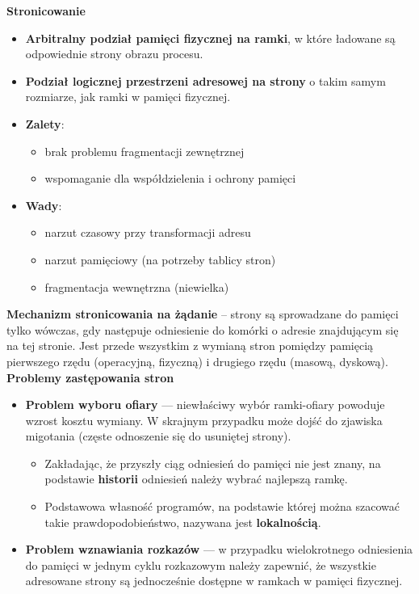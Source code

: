 \documentclass[main.tex]{subfiles}
\begin{document}
    \noindent \textbf{Stronicowanie}
    \begin{itemize}[noitemsep]
        \item \textbf{Arbitralny podział pamięci fizycznej na ramki}, w które ładowane są odpowiednie strony obrazu procesu.
        \item \textbf{Podział logicznej przestrzeni adresowej na strony} o takim samym rozmiarze, jak ramki w pamięci fizycznej.
        \item \textbf{Zalety}:
        \begin{itemize}[noitemsep]
            \item brak problemu fragmentacji zewnętrznej
            \item wspomaganie dla współdzielenia i ochrony pamięci
        \end{itemize}
        \item \textbf{Wady}:
        \begin{itemize}[noitemsep]
            \item narzut czasowy przy transformacji adresu
            \item narzut pamięciowy (na potrzeby tablicy stron)
            \item fragmentacja wewnętrzna (niewielka)
        \end{itemize}
    \end{itemize}

    \noindent \textbf{Mechanizm stronicowania na żądanie} -- strony są sprowadzane do pamięci tylko wówczas, gdy następuje
    odniesienie do komórki o adresie znajdującym się na tej stronie. Jest przede wszystkim z wymianą stron pomiędzy
    pamięcią pierwszego rzędu (operacyjną, fizyczną) i drugiego rzędu (masową, dyskową).\\

    \noindent \textbf{Problemy zastępowania stron}
    \begin{itemize}[noitemsep]
        \item \textbf{Problem wyboru ofiary} — niewłaściwy wybór ramki-ofiary powoduje wzrost kosztu wymiany.
        W skrajnym przypadku może dojść do zjawiska migotania (częste odnoszenie się do usuniętej strony).
        \begin{itemize}[noitemsep]
            \item Zakładając, że przyszły ciąg odniesień do pamięci nie jest znany, na podstawie \textbf{historii}
            odniesień należy wybrać najlepszą ramkę.
            \item Podstawowa własność programów, na podstawie której można szacować takie prawdopodobieństwo,
            nazywana jest \textbf{lokalnością}.
        \end{itemize}

        \item \textbf{Problem wznawiania rozkazów} — w przypadku wielokrotnego odniesienia do pamięci w jednym cyklu
        rozkazowym należy zapewnić, że wszystkie adresowane strony są jednocześnie dostępne w ramkach w pamięci fizycznej.
    \end{itemize}
\end{document}
